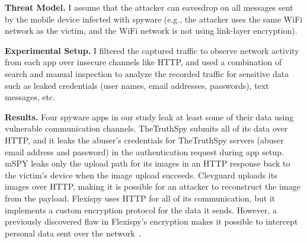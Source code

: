 \textbf{Threat Model.} I assume that the attacker can eavesdrop on
all messages sent by the mobile device infected with spyware (e.g.,
the attacker uses the same WiFi network as the victim, and the WiFi
network is not using link-layer encryption).



\textbf{Experimental Setup.}
I filtered the captured traffic to observe network activity from each app over
insecure channels like HTTP, and used a combination of search and
manual inspection to analyze the recorded traffic for sensitive data
such as leaked credentials (user names, email addresses, passwords),
text messages,
etc.



\textbf{Results.}  Four spyware apps in our study leak at least some
of their data using vulnerable communication channels.  TheTruthSpy
submits all of its data over HTTP, and it leaks the abuser's
credentials for TheTruthSpy servers (abuser email address and
password) in the authentication request during app setup.
mSPY leaks only
the upload path for its images in an HTTP response back to the
victim's device when the image upload succeeds.
Clevguard uploads its images over HTTP, making it is possible for an attacker to reconstruct the image from the payload.  Flexispy uses
HTTP for all of its communication, but it implements a custom
encryption protocol for the data it sends.  However, a previously
discovered flaw in Flexispy's encryption makes it possible to
intercept personal data sent over the
network~\cite{Stalking85:online}.

